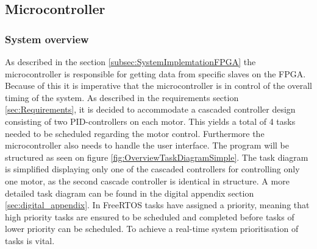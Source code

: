 \documentclass[../../main.tex]{subfiles}
\begin{document}
\subsection{Microcontroller} \label{subsec:SystemImplementationMicroController}

\subsubsection*{System overview}
\label{subsec:SystemImplementationOperatingSystem}

As described in the section \ref{subsec:SystemImplemtationFPGA} the microcontroller is responsible for getting data from specific slaves on the FPGA. Because of this it is imperative that the microcontroller is in control of the overall timing of the system. As described in the requirements section \ref{sec:Requirements}, it is decided to accommodate a cascaded controller design consisting of two PID-controllers on each motor. This yields a total of 4 tasks needed to be scheduled regarding the motor control. Furthermore the microcontroller also needs to handle the user interface. The program will be structured as seen on figure \ref{fig:OverviewTaskDiagramSimple}. The task diagram is simplified displaying only one of the cascaded controllers for controlling only one motor, as the second cascade controller is identical in structure. A more detailed task diagram can be found in the digital appendix section \ref{sec:digital_appendix}. In FreeRTOS tasks have assigned a priority, meaning that high priority tasks are ensured to be scheduled and completed before tasks of lower priority can be scheduled. To achieve a real-time system prioritisation of tasks is vital.





\end{document}
